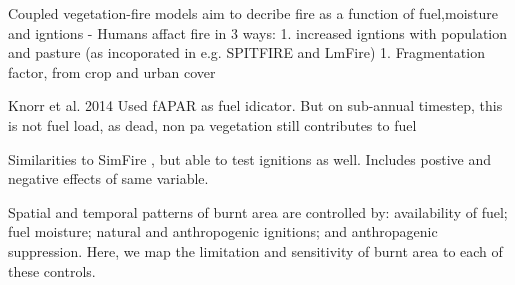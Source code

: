 Coupled vegetation-fire models aim to decribe fire as a function of fuel,moisture and igntions \citep{hantson2016status}
- Humans affact fire in 3 ways:
	1. increased igntions with population and pasture (as incoporated in e.g. SPITFIRE and LmFire)
	1. Fragmentation factor, from crop and urban cover

Knorr et al. 2014 Used fAPAR as fuel idicator. But on sub-annual timestep, this is not fuel load, as dead, non pa vegetation
still contributes to fuel

Similarities to SimFire \citep{knorr2016climate}, but able to test ignitions as well.
Includes postive and negative effects of same variable.


Spatial and temporal patterns of burnt area are controlled by:
    availability of fuel;
    fuel moisture;
    natural and anthropogenic ignitions;
    and anthropagenic suppression.
Here, we map the limitation and sensitivity of burnt area to each of these controls.
